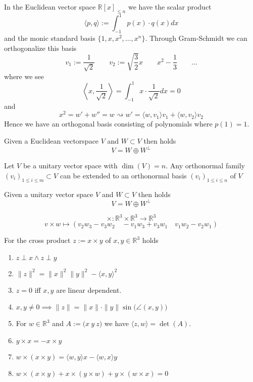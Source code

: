 \begin{example}
   In the Euclidean vector space \(\mathbb{R}[x]_{\leq n}\) we have the scalar product
   \[\langle p, q\rangle := \int_{-1}^1 p(x) \cdot q(x) dx\]
   and the monic standard basis \(\{1, x, x^2, \ldots, x^n\}\).
   Through Gram-Schmidt we can orthogonalize this basis
   \[v_1 := \frac{1}{\sqrt{2}} \qquad v_2 := \sqrt{\frac{3}{2}}x \qquad x^2 - \frac{1}{3} \qquad \ldots\]
   where we see
   \[\left\langle x, \frac{1}{\sqrt{2}}\right\rangle = \int_{-1}^1 x \cdot \frac{1}{\sqrt{2}} dx = 0\]
   and
   \[x^2 = w' + w'' = w \rightsquigarrow w' = \langle w, v_1 \rangle v_1 + \langle w, v_2\rangle v_2\]
   Hence we have an orthogonal basis consisting of polynomials where \(p(1) = 1\).
\end{example}

\begin{corollary}\label{cor:gram-schmidt}
   Given a Euclidean vectorspace \(V\) and \(W \subset V\) then holds
   \[V = W \oplus W^\perp\]
\end{corollary}

\begin{proposition}
   Let \(V\) be a unitary vector space with \(\dim(V) = n\). Any orthonormal family \((v_i)_{1\leq i \leq m} \subset V\)  can be extended to an orthonormal basis \((v_i)_{1 \leq i \leq n}\) of \(V\)
\end{proposition}
\begin{corollary}
   Given a unitary vector space \(V\) and \(W \subset V\) then holds
   \[V = W \oplus W^\perp\]
\end{corollary}

\begin{definition}
   \[\times: \mathbb{R}^3 \times \mathbb{R}^3 \to \mathbb{R}^3\]
   \[v \times w \mapsto (v_2w_3 - v_3w_2 \quad -v_1w_3 + v_3w_1 \quad v_1w_2 - v_2w_1)\]
\end{definition}

\begin{proposition}
   For the cross product \(z := x \times y\) of \(x, y \in \mathbb{R}^3\) holds
   \begin{enumerate}[label=\roman*, align=Center]
      \item \(z \perp x \land z \perp y\)
      \item \(\|z\|^2 = \|x\|^2\|y\|^2 - \langle x, y \rangle^2\)
      \item \(z = 0\) iff \(x, y\) are linear dependent.
      \item \(x, y \neq 0 \implies \|z\| = \|x\|\cdot\|y\| \sin\big(\angle(x, y)\big)\)
      \item For \(w \in \mathbb{R}^3\) and \(A := \big(x~y~z\big)\) we have \(\langle z, w\rangle = \det(A)\).
      \item \(y \times x = -x \times y\)
      \item \(w \times (x \times y) = \langle w, y\rangle x- \langle w, x \rangle y\)
      \item \(w \times (x \times y) + x \times (y \times w) + y \times (w \times x) = 0\)
   \end{enumerate}
\end{proposition}

